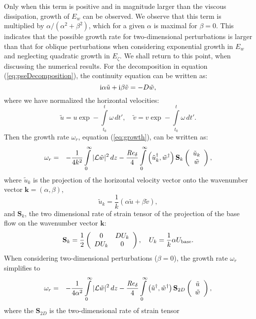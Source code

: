 \documentclass{jfm}
\newcommand\be{\begin{equation}}
\newcommand\ee{\end{equation}}
\newcommand\bea{\begin{eqnarray}}
\newcommand\eea{\end{eqnarray}}
\newcommand\base{{\rm base}}
\newcommand\Rey{\mbox{\textit{Re}}}  %
\begin{document}
Only when this term is positive and in magnitude larger than the viscous dissipation,
growth of $ E_w $ can be observed. We observe that this term is multiplied
by $ \alpha/(\alpha^2 + \beta^2 ) $, which for a given $ \alpha $ is maximal for
$ \beta = 0 $. This indicates that the possible growth rate for two-dimensional
perturbations is larger than that for oblique perturbations when considering exponential growth in $ E_w $ and neglecting quadratic growth in $ E_\zeta $.
We shall return to this point, when discussing the numerical results. 
For the decomposition in equation (\ref{eq:pseDecomposition}), the continuity
equation can be written as:
\be
{\rm i} \alpha \tilde{u} + {\rm i} \beta \tilde{v} = - D \tilde{w},
\ee
where we have normalized the horizontal velocities:
\be
\tilde{u} = u \exp - \int \limits_{t_0}^{t} \omega \, dt',
\quad \tilde{v} = v \exp - \int \limits_{t_0}^{t} \omega \, dt'.
\ee
Then the growth rate $ \omega_r $,
equation (\ref{eq:growth}), can be written as:
\bea
\omega_r& =& - \frac{1}{4 k^2}
\int \limits_0^\infty | \mathcal{L} \tilde{w}|^2
\, dz  - \frac{ \Rey_\delta}{4}
\int \limits_0^\infty  \left( \tilde{u}^\dagger_k , \tilde{w}^\dagger \right)
\mathbf{S}_k
 \left( \begin{array}{c} \tilde{u}_k \\ \tilde{w} \end{array} \right),
\eea
where $ \tilde{u}_k $ is the projection of the horizontal velocity vector onto the
wavenumber vector $ \mathbf{k} = ( \alpha , \beta ) $,
\be
\tilde{u}_k = \frac{1}{k} \left( \alpha \tilde{u} + \beta \tilde{v} \right),
\ee
and $ \mathbf{S}_k $, the two dimensional rate of strain
tensor of the projection of the base flow on the wavenumber vector
$ \mathbf{k} $:
\be
\mathbf{S}_k = \frac{1}{2} \left( \begin{array}{cc} 0 &  D U_k \\ D U_k  & 0
\end{array} \right), \quad
U_k = \frac{1}{k} \alpha U_\base.
\ee
When considering two-dimensional perturbations ($ \beta = 0 $), the growth rate $ \omega_r $ simplifies to
\bea
\omega_r& =& - \frac{1}{4 \alpha^2}
\int \limits_0^\infty | \mathcal{L} \tilde{w}|^2
\, dz  - \frac{ \Rey_\delta}{4}
\int \limits_0^\infty  \left( \tilde{u}^\dagger , \tilde{w}^\dagger \right)
\mathbf{S}_{2D}
 \left( \begin{array}{c} \tilde{u} \\ \tilde{w} \end{array} \right), \label{eq:tilting}
\eea
where the $ \mathbf{S}_{2D} $ is the two-dimensional rate of strain tensor
\end{document}
